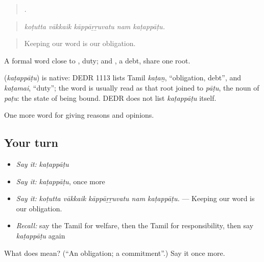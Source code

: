 \begin{quote}
    .
\end{quote}

\begin{quote}
\emph{koṭutta vākkaik kāppāṟṟuvatu nam kaṭappāṭu.}
\end{quote}

\begin{quote}
Keeping our word is our obligation.
\end{quote}

A formal word close to , duty;  and , a debt, share one root.

\begin{cousinweb}
\textbf{} (\emph{kaṭappāṭu}) is native: DEDR 1113 lists Tamil \emph{kaṭaṉ}, \textquotedblleft{}obligation, debt\textquotedblright{}, and \emph{kaṭamai}, \textquotedblleft{}duty\textquotedblright{}; the word is usually read as that root joined to \emph{pāṭu}, the noun of \emph{paṭu}: the state of being bound. DEDR does not list \emph{kaṭappāṭu} itself.
\end{cousinweb}

\begin{grammarlens}[title={What you've built}]
One more word for giving reasons and opinions.
\end{grammarlens}

\subsection*{Your turn}
\begin{itemize}
\raggedright
  \item \emph{Say it:} \emph{kaṭappāṭu}
  \item \emph{Say it:} \emph{kaṭappāṭu}, once more
  \item \emph{Say it:} \emph{koṭutta vākkaik kāppāṟṟuvatu nam kaṭappāṭu.} — Keeping our word is our obligation.
  \item \emph{Recall:} say the Tamil for welfare, then the Tamil for responsibility, then say \emph{kaṭappāṭu} again
\end{itemize}

\begin{tcolorbox}[breakable,colback=teal!4,colframe=teal!35!black,title={Before you move on}]
What does  mean? (\textquotedblleft{}An obligation; a commitment\textquotedblright{}.) Say it once more.
\end{tcolorbox}
